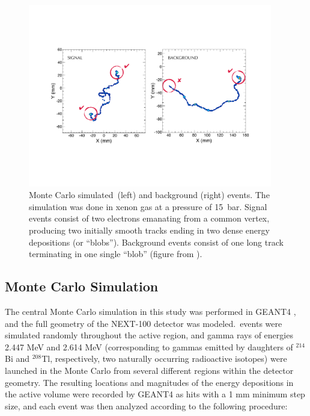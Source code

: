 \documentclass{JINST}
\begin{document}
\begin{figure}[!htb]
	\centering
	\includegraphics[width= 0.95\textwidth]{fig/TrackSignature.pdf}
	\caption{Monte Carlo simulated \bbonu\,(left) and background (right) events.  The simulation was done in xenon gas at a pressure of 15~bar. Signal events consist of two electrons emanating
		from a common vertex, producing two initially smooth tracks ending in two dense energy depositions (or ``blobs'').  Background events consist of one long track terminating in one
		single ``blob'' (figure from \cite{MartinAlbo_thesis}).} \label{fig.ETRK2}
\end{figure}

\subsection{Monte Carlo Simulation}\label{ssec:NEXT100MC}
The central Monte Carlo simulation in this study was performed in GEANT4 \cite{GEANT4}, and the full geometry of the NEXT-100 detector was modeled.  \bbonu\,events were
simulated randomly throughout the active region, and gamma rays of energies 2.447 MeV and 2.614 MeV (corresponding to gammas emitted by daughters of $^{214}$Bi and $^{208}$Tl,
respectively, two naturally occurring radioactive isotopes) were launched in the Monte Carlo from several different regions within the detector geometry. %
The resulting locations and magnitudes of the energy depositions in the active volume were recorded by GEANT4 as hits with a 1 mm minimum step size, and each event was then
analyzed according to the following procedure:
\end{document}
